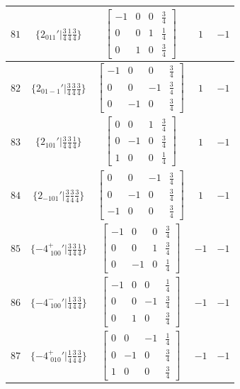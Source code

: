\documentclass[fleqn,8pt]{jsarticle}
\begin{document}
\begin{longtable}{ccccc}
$ 81 $ & $ \{2{}_{011}{}'|\frac{3}{4} \frac{1}{4} \frac{3}{4}\} $ & $ \begin{bmatrix} -1 & 0 & 0 & \frac{3}{4} \\ 0 & 0 & 1 & \frac{1}{4} \\ 0 & 1 & 0 & \frac{3}{4} \end{bmatrix} $ & $ 1 $ & $ -1 $ \\ \hline
$ 82 $ & $ \{2{}_{01-1}{}'|\frac{3}{4} \frac{3}{4} \frac{3}{4}\} $ & $ \begin{bmatrix} -1 & 0 & 0 & \frac{3}{4} \\ 0 & 0 & -1 & \frac{3}{4} \\ 0 & -1 & 0 & \frac{3}{4} \end{bmatrix} $ & $ 1 $ & $ -1 $ \\ \hline
$ 83 $ & $ \{2{}_{101}{}'|\frac{3}{4} \frac{3}{4} \frac{1}{4}\} $ & $ \begin{bmatrix} 0 & 0 & 1 & \frac{3}{4} \\ 0 & -1 & 0 & \frac{3}{4} \\ 1 & 0 & 0 & \frac{1}{4} \end{bmatrix} $ & $ 1 $ & $ -1 $ \\ \hline
$ 84 $ & $ \{2{}_{-101}{}'|\frac{3}{4} \frac{3}{4} \frac{3}{4}\} $ & $ \begin{bmatrix} 0 & 0 & -1 & \frac{3}{4} \\ 0 & -1 & 0 & \frac{3}{4} \\ -1 & 0 & 0 & \frac{3}{4} \end{bmatrix} $ & $ 1 $ & $ -1 $ \\ \hline
$ 85 $ & $ \{-4^{+}_{\,\,100}{}'|\frac{3}{4} \frac{3}{4} \frac{1}{4}\} $ & $ \begin{bmatrix} -1 & 0 & 0 & \frac{3}{4} \\ 0 & 0 & 1 & \frac{3}{4} \\ 0 & -1 & 0 & \frac{1}{4} \end{bmatrix} $ & $ -1 $ & $ -1 $ \\ \hline
$ 86 $ & $ \{-4^{-}_{\,\,100}{}'|\frac{1}{4} \frac{3}{4} \frac{3}{4}\} $ & $ \begin{bmatrix} -1 & 0 & 0 & \frac{1}{4} \\ 0 & 0 & -1 & \frac{3}{4} \\ 0 & 1 & 0 & \frac{3}{4} \end{bmatrix} $ & $ -1 $ & $ -1 $ \\ \hline
$ 87 $ & $ \{-4^{+}_{\,\,010}{}'|\frac{1}{4} \frac{3}{4} \frac{3}{4}\} $ & $ \begin{bmatrix} 0 & 0 & -1 & \frac{1}{4} \\ 0 & -1 & 0 & \frac{3}{4} \\ 1 & 0 & 0 & \frac{3}{4} \end{bmatrix} $ & $ -1 $ & $ -1 $ \\ \hline

\end{longtable}
\end{document}

